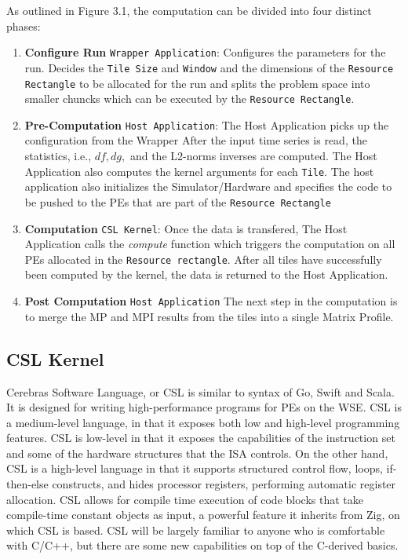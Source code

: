 As outlined in Figure 3.1, the computation can be divided into four distinct phases:
\begin{enumerate}
    \item \textbf{Configure Run} \texttt{Wrapper Application}: Configures the parameters for the run. Decides the \texttt{Tile Size} and \texttt{Window} and the dimensions of the \texttt{Resource Rectangle} to be allocated for the run and splits the problem space into smaller chuncks which can be executed by the \texttt{Resource Rectangle}.
    \item \textbf{Pre-Computation} \texttt{Host Application}: The Host Application picks up the configuration from the Wrapper After the input time series is read, the statistics, i.e., $df, dg, $ and the L2-norms inverses are computed. The Host Application also computes the kernel arguments for each \texttt{Tile}. The host application also initializes the Simulator/Hardware and specifies the code to be pushed to the PEs that are part of the \texttt{Resource Rectangle}
    \item \textbf{Computation} \texttt{CSL Kernel}: Once the data is transfered, The Host Application calls the \textit{compute} function which triggers the computation on all PEs allocated in the \texttt{Resource rectangle}. After all tiles have successfully been
    computed by the kernel, the data is returned to the Host Application.
    \item \textbf{Post Computation} \texttt{Host Application} The next step in the computation is to merge the MP and MPI results from the tiles into a single Matrix Profile.
\end{enumerate}


\subsection{CSL Kernel}

Cerebras Software Language, or CSL is similar to syntax of Go, Swift and Scala.
It is designed for writing high-performance programs for PEs on the WSE. CSL is a medium-level language, in that it exposes both low and high-level programming features. CSL is low-level in
that it exposes the capabilities of the instruction set and some of the hardware structures that the
ISA controls. On the other hand, CSL is a high-level language in that it supports structured control
flow, loops, if-then-else constructs, and hides processor registers, performing automatic register
allocation. CSL allows for compile time execution of code blocks that take compile-time constant
objects as input, a powerful feature it inherits from Zig, on which CSL is based. CSL will be largely
familiar to anyone who is comfortable with C/C++, but there are some new capabilities on top of
the C-derived basics.\\

